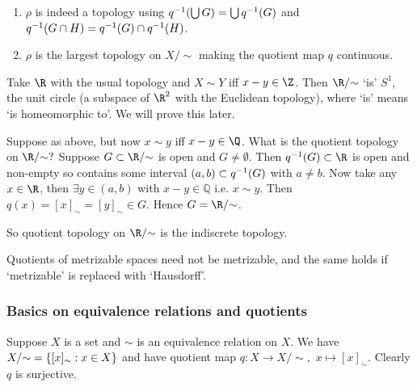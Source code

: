 \begin{remark}
    \begin{enumerate}
        \item $\rho$ is indeed a topology using $q^{-1}(\bigcup G) = \bigcup q^{-1}(G)$ and $q^{-1} (G\cap H) = q^{-1}(G)\cap q^{-1} (H)$.
    
        \item $\rho$ is the largest topology on $X/ {\sim}$ making the quotient map $q$ continuous.
    \end{enumerate} 
\end{remark}

\begin{example}
    Take $\R$ with the usual topology and $X\sim Y$ iff $x-y\in \Z$.
    Then $\R/ {\sim}$ `is' $S^1$, the unit circle (a subspace of $\R^2$ with the Euclidean topology), where `is' means `is homeomorphic to'.
    We will prove this later.
\end{example} 

\begin{example}
    Suppose as above, but now $x\sim y$ iff $x-y\in \Q$. What is the quotient topology on $\R/ {\sim}?$ 
    Suppose $G\subset \R/ {\sim}$ is open and $G\neq \emptyset$.
    Then $q\inv (G)\subset\R$ is open and non-empty so contains some interval $(a,b)\subset q^{-1} (G)$ with $a\neq b$. 
    Now take any $x\in \R$, then $\exists y\in (a,b)$ with $x-y\in \mathbb{Q}$ i.e. $x\sim y$. 
    Then $q(x) = [x]_\sim = [y]_\sim \in G$. Hence $G = \R/ {\sim}$. 
    
    So quotient topology on $\R/ {\sim}$ is the indiscrete topology.
\end{example} 

\begin{example}
    Quotients of metrizable spaces need not be metrizable, and the same holds if `metrizable' is replaced with `Hausdorff'.
\end{example} 

\subsubsection{Basics on equivalence relations and quotients}

Suppose $X$ is a set and $\sim$ is an equivalence relation on $X$. We have $X/ {\sim} = \{[x]_\sim : x\in X\}$ and have quotient map $q:X \to X/ {\sim},$ $x \mapsto [x]_\sim$. Clearly $q$ is surjective.

